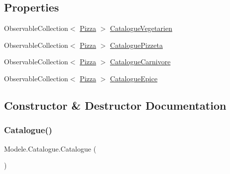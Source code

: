 \subsection*{Properties}
\begin{DoxyCompactItemize}
\item 
Observable\+Collection$<$ \hyperlink{classModele_1_1Pizza}{Pizza} $>$ \hyperlink{classModele_1_1Catalogue_abd7d6d70ddd6ba264c1c91a5b084d9ba}{Catalogue\+Vegetarien}
\item 
Observable\+Collection$<$ \hyperlink{classModele_1_1Pizza}{Pizza} $>$ \hyperlink{classModele_1_1Catalogue_ac5490e1026b5b08d43e30b68da893423}{Catalogue\+Pizzeta}
\item 
Observable\+Collection$<$ \hyperlink{classModele_1_1Pizza}{Pizza} $>$ \hyperlink{classModele_1_1Catalogue_a4af9ef768f67cef6dfe545e22a6d63af}{Catalogue\+Carnivore}
\item 
Observable\+Collection$<$ \hyperlink{classModele_1_1Pizza}{Pizza} $>$ \hyperlink{classModele_1_1Catalogue_a633610212f42551a5755212e21bedbca}{Catalogue\+Epice}
\end{DoxyCompactItemize}


\subsection{Constructor \& Destructor Documentation}
\mbox{\label{classModele_1_1Catalogue_a93f737e4c7e5e5b4ff8317b899d15d3b}} 
\subsubsection{\texorpdfstring{Catalogue()}{Catalogue()}}
{\footnotesize\ttfamily Modele.\+Catalogue.\+Catalogue (\begin{DoxyParamCaption}{ }\end{DoxyParamCaption})\hspace{0.3cm}{\ttfamily [inline]}}



